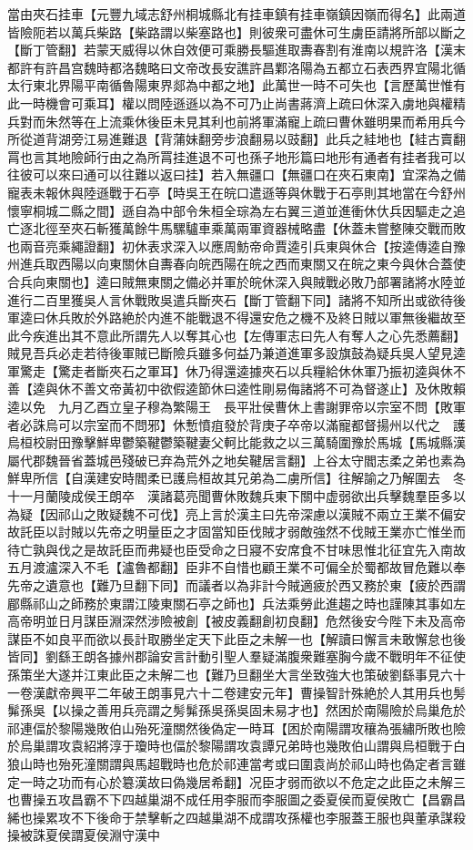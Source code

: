 當由夾石挂車【元豐九域志舒州桐城縣北有挂車鎮有挂車嶺鎮因嶺而得名】此兩道皆險阨若以萬兵柴路【柴路謂以柴塞路也】則彼衆可盡休可生虜臣請將所部以斷之【斷丁管翻】若蒙天威得以休自效便可乘勝長驅進取夀春割有淮南以規許洛【漢末都許有許昌宫魏時都洛魏略曰文帝改長安譙許昌鄴洛陽為五都立石表西界宜陽北循太行東北界陽平南循魯陽東界郯為中都之地】此萬世一時不可失也【言歷萬世惟有此一時機會可乘耳】權以問陸遜遜以為不可乃止尚書蔣濟上疏曰休深入虜地與權精兵對而朱然等在上流乘休後臣未見其利也前將軍滿寵上疏曰曹休雖明果而希用兵今所從道背湖旁江易進難退【背蒲妹翻旁步浪翻易以豉翻】此兵之絓地也【絓古賣翻罥也言其地險師行由之為所罥挂進退不可也孫子地形篇曰地形有通者有挂者我可以往彼可以來曰通可以往難以返曰挂】若入無疆口【無疆口在夾石東南】宜深為之備寵表未報休與陸遜戰于石亭【時吳王在皖口遣遜等與休戰于石亭則其地當在今舒州懷寧桐城二縣之間】遜自為中部令朱桓全琮為左右翼三道並進衝休㐲兵因驅走之追亡逐北徑至夾石斬獲萬餘牛馬騾驢車乘萬兩軍資器械略盡【休蓋未嘗整陳交戰而敗也兩音亮乘繩證翻】初休表求深入以應周魴帝命賈逵引兵東與休合【按逵傳逵自豫州進兵取西陽以向東關休自夀春向皖西陽在皖之西而東關又在皖之東今與休合蓋使合兵向東關也】逵曰賊無東關之備必并軍於皖休深入與賊戰必敗乃部署諸將水陸並進行二百里獲吳人言休戰敗吳遣兵斷夾石【斷丁管翻下同】諸將不知所出或欲待後軍逵曰休兵敗於外路絶於内進不能戰退不得還安危之機不及終日賊以軍無後繼故至此今疾進出其不意此所謂先人以奪其心也【左傳軍志曰先人有奪人之心先悉薦翻】賊見吾兵必走若待後軍賊已斷險兵雖多何益乃兼道進軍多設旗鼓為疑兵吳人望見逵軍驚走【驚走者斷夾石之軍耳】休乃得還逵據夾石以兵糧給休休軍乃振初逵與休不善【逵與休不善文帝黃初中欲假逵節休曰逵性剛易侮諸將不可為督遂止】及休敗賴逵以免　九月乙酉立皇子穆為繁陽王　長平壯侯曹休上書謝罪帝以宗室不問【敗軍者必誅烏可以宗室而不問邪】休慙憤疽發於背庚子卒帝以滿寵都督揚州以代之　護烏桓校尉田豫擊鮮卑鬱築鞬鬱築鞬妻父軻比能救之以三萬騎圍豫於馬城【馬城縣漢屬代郡魏晉省蓋城邑殘破已弃為荒外之地矣鞬居言翻】上谷太守閻志柔之弟也素為鮮卑所信【自漢建安時閻柔已護烏桓故其兄弟為二虜所信】往解諭之乃解圍去　冬十一月蘭陵成侯王朗卒　漢諸葛亮聞曹休敗魏兵東下關中虚弱欲出兵擊魏羣臣多以為疑【因祁山之敗疑魏不可伐】亮上言於漢主曰先帝深慮以漢賊不兩立王業不偏安故託臣以討賊以先帝之明量臣之才固當知臣伐賊才弱敵強然不伐賊王業亦亡惟坐而待亡孰與伐之是故託臣而弗疑也臣受命之日寢不安席食不甘味思惟北征宜先入南故五月渡瀘深入不毛【瀘魯都翻】臣非不自惜也顧王業不可偏全於蜀都故冒危難以奉先帝之遺意也【難乃旦翻下同】而議者以為非計今賊適疲於西又務於東【疲於西謂郿縣祁山之師務於東謂江陵東關石亭之師也】兵法乘勞此進趨之時也謹陳其事如左高帝明並日月謀臣淵深然涉險被創【被皮義翻創初良翻】危然後安今陛下未及高帝謀臣不如良平而欲以長計取勝坐定天下此臣之未解一也【解讀曰懈言未敢懈怠也後皆同】劉繇王朗各據州郡論安言計動引聖人羣疑滿腹衆難塞胸今歲不戰明年不征使孫策坐大遂并江東此臣之未解二也【難乃旦翻坐大言坐致強大也策破劉繇事見六十一卷漢獻帝興平二年破王朗事見六十二卷建安元年】曹操智計殊絶於人其用兵也髣髴孫吳【以操之善用兵亮謂之髣髴孫吳孫吳固未易才也】然困於南陽險於烏巢危於祁連偪於黎陽幾敗伯山殆死潼關然後偽定一時耳【困於南陽謂攻穰為張繡所敗也險於烏巢謂攻袁紹將淳于瓊時也偪於黎陽謂攻袁譚兄弟時也幾敗伯山謂與烏桓戰于白狼山時也殆死潼關謂與馬超戰時也危於祁連當考或曰圍袁尚於祁山時也偽定者言雖定一時之功而有心於簒漢故曰偽幾居希翻】况臣才弱而欲以不危定之此臣之未解三也曹操五攻昌霸不下四越巢湖不成任用李服而李服圖之委夏侯而夏侯敗亡【昌霸昌絺也操累攻不下後命于禁擊斬之四越巢湖不成謂攻孫權也李服蓋王服也與董承謀殺操被誅夏侯謂夏侯淵守漢中